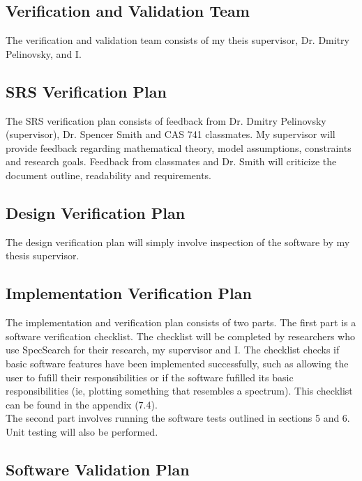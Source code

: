 \documentclass[12pt, titlepage]{article}
\begin{document}
\subsection{Verification and Validation Team}

The verification and validation team consists of my theis supervisor, Dr. 
Dmitry Pelinovsky, and I. \\

\subsection{SRS Verification Plan}

The SRS verification plan consists of feedback from Dr. Dmitry Pelinovsky 
(supervisor), Dr. Spencer Smith and CAS 741 classmates. My supervisor will 
provide feedback regarding mathematical theory, model assumptions, constraints 
and research goals. Feedback from classmates and Dr. Smith will criticize the 
document outline, readability and requirements. 

\subsection{Design Verification Plan}

The design verification plan will simply involve inspection of the software by 
my thesis supervisor. 

\subsection{Implementation Verification Plan}

The implementation and verification plan consists of two parts. The first part 
is a software verification checklist. The checklist will be completed by 
researchers who use SpecSearch for their research, my supervisor and I. The 
checklist checks if basic software features have been implemented successfully, 
such as 
allowing the user to fufill their responsibilities or if the software fufilled 
its basic responsibilities (ie, plotting something that resembles a spectrum). 
This checklist can be found in the appendix (7.4).\\

 The 
second part involves running the software tests 
outlined in sections 5 and 6. Unit testing will also be performed. 

\subsection{Software Validation Plan}
\end{document}
